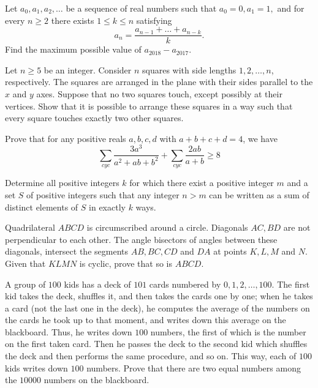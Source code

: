 \documentclass[11pt]{scrartcl}
\begin{document}
\begin{problem}[3923745101517032298]
	Let $a_0,a_1,a_2,\dots $ be a sequence of real numbers such that $a_0=0, a_1=1,$ and for every $n\geq 2$ there exists $1 \leq k \leq n$ satisfying\[ a_n=\frac{a_{n-1}+\dots + a_{n-k}}{k}. \]Find the maximum possible value of $a_{2018}-a_{2017}$.
\end{problem}
\begin{problem}[3951159057888736589]
Let $n \geq 5$ be an integer. Consider $n$ squares with side lengths $1, 2, \dots , n$, respectively. The squares are arranged in the plane with their sides parallel to the $x$ and $y$ axes. Suppose that no two squares touch, except possibly at their vertices. Show that it is possible to arrange these squares in a way such that every square touches exactly two other squares.
\end{problem}
\begin{problem}[3960942508493751074]
	Prove that for any positive reals $ a,b,c,d $ with $ a+b+c+d = 4 $, we have$$ \sum\limits_{cyc}{\frac{3a^3}{a^2+ab+b^2}}+\sum\limits_{cyc}{\frac{2ab}{a+b}} \ge 8 $$
\end{problem}
\begin{problem}[3975075785518808190]
Determine all positive integers $k$ for which there exist a positive integer $m$ and a set $S$ of positive integers such that any integer $n > m$ can be written as a sum of distinct elements of $S$ in exactly $k$ ways.
\end{problem}
\begin{problem}[3982719612496247400]
	Quadrilateral $ABCD$ is circumscribed around a circle. Diagonals $AC,BD$ are not perpendicular to each other. The angle bisectors of angles between these diagonals, intersect the segments $AB,BC,CD$ and $DA$ at points $K,L,M$ and $N$. Given that $KLMN$ is cyclic, prove that so is $ABCD$.
\end{problem}
\begin{problem}[4000488814786935591]
A group of $100$ kids has a deck of $101$ cards numbered by $0, 1, 2,\dots, 100$. The first kid takes the deck, shuffles it, and then takes the cards one by one; when he takes a card (not the last one in the deck), he computes the average of the numbers on the cards he took up to that moment, and writes down this average on the blackboard. Thus, he writes down $100$ numbers, the first of which is the number on the first taken card. Then he passes the deck to the second kid which shuffles the deck and then performs the same procedure, and so on. This way, each of $100$ kids writes down $100$ numbers. Prove that there are two equal numbers among the $10000$ numbers on the blackboard.
\end{problem}
\end{document}
